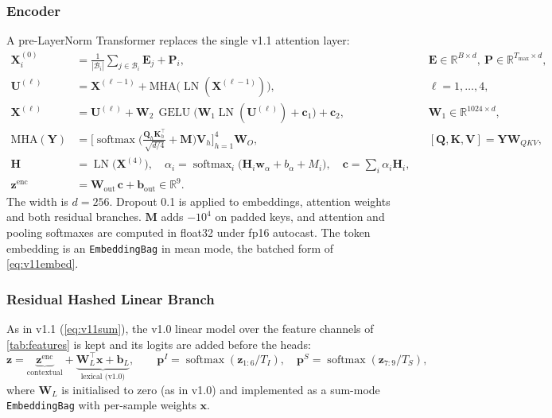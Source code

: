 \documentclass[11pt,a4paper]{article}
\theoremstyle{remark}
\newcommand{\R}{\mathbb{R}}
\newcommand{\x}{\bm{x}}
\newcommand{\W}{\bm{W}}
\newcommand{\bb}{\bm{b}}
\newcommand{\z}{\bm{z}}
\newcommand{\p}{\bm{p}}
\DeclareMathOperator{\softmax}{softmax}
\DeclareMathOperator{\LN}{LN}
\DeclareMathOperator{\GELU}{GELU}
\begin{document}
\subsubsection{Encoder}
A pre-LayerNorm Transformer replaces the single v1.1 attention layer:
\begin{align}
  \bm X^{(0)}_i &= \frac{1}{|\mathcal{B}_i|}\sum_{j\in\mathcal{B}_i}\bm E_j + \bm P_i, && \bm E\in\R^{B\times d},\ \bm P\in\R^{T_{\max}\times d}, \label{eq:v12embed}\\
  \bm U^{(\ell)} &= \bm X^{(\ell-1)} + \mathrm{MHA}\big(\LN(\bm X^{(\ell-1)})\big), && \ell = 1,\dots,4, \\
  \bm X^{(\ell)} &= \bm U^{(\ell)} + \bm W_2\,\GELU\big(\bm W_1 \LN(\bm U^{(\ell)}) + \bm c_1\big) + \bm c_2, && \bm W_1\in\R^{1024\times d}, \\
  \mathrm{MHA}(\bm Y) &= \Big[\softmax\Big(\tfrac{\bm Q_h\bm K_h^{\!\top}}{\sqrt{d/4}} + \bm M\Big)\bm V_h\Big]_{h=1}^{4}\bm W_O, && [\bm Q,\bm K,\bm V] = \bm Y\bm W_{QKV}, \\
  \bm H &= \LN\big(\bm X^{(4)}\big),\quad \alpha_i = \softmax_i\big(\bm H_i\bm w_\alpha + b_\alpha + M_i\big),\quad \bm c = \textstyle\sum_i\alpha_i\bm H_i, \label{eq:v12pool}\\
  \z^{\text{enc}} &= \bm W_{\text{out}}\,\bm c + \bm b_{\text{out}} \in\R^{9}.
\end{align}
The width is $d=256$. Dropout 0.1 is applied to embeddings, attention weights and both residual branches. $\bm M$ adds $-10^4$ on padded keys, and attention and pooling softmaxes are computed in float32 under fp16 autocast. The token embedding is an \texttt{EmbeddingBag} in mean mode, the batched form of \cref{eq:v11embed}.

\subsubsection{Residual Hashed Linear Branch}
As in v1.1 (\cref{eq:v11sum}), the v1.0 linear model over the feature channels of \cref{tab:features} is kept and its logits are added before the heads:
\begin{equation}
  \z = \underbrace{\z^{\text{enc}}}_{\text{contextual}} + \underbrace{\W_L^{\!\top}\x + \bb_L}_{\text{lexical (v1.0)}},\qquad
  \p^{I}=\softmax(\z_{1:6}/T_I),\quad \p^{S}=\softmax(\z_{7:9}/T_S),
  \label{eq:v12sum}
\end{equation}
where $\W_L$ is initialised to zero (as in v1.0) and implemented as a sum-mode \texttt{EmbeddingBag} with per-sample weights $\x$.
\end{document}
